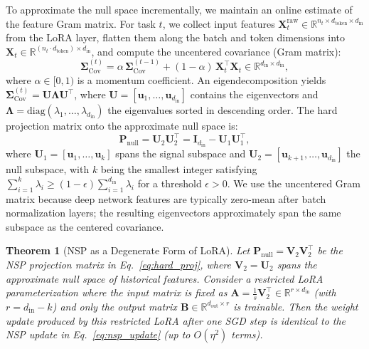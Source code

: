 \documentclass{article}
\newtheorem{theorem}{Theorem}[section]
\begin{document}
To approximate the null space incrementally, we maintain an online estimate of the feature Gram matrix. For task $t$, we collect input features $\mathbf{X}_t^{\text{raw}} \in \mathbb{R}^{n_t \times d_{\text{token}} \times d_{\text{in}}}$ from the LoRA layer, flatten them along the batch and token dimensions into $\mathbf{X}_t \in \mathbb{R}^{(n_t \cdot d_{\text{token}}) \times d_{\text{in}}}$, and compute the uncentered covariance (Gram matrix):
\begin{equation}
    \mathbf{\Sigma}_{\text{Cov}}^{(t)} = \alpha \, \mathbf{\Sigma}_{\text{Cov}}^{(t-1)} + (1-\alpha) \, \mathbf{X}_t^\top \mathbf{X}_t \in \mathbb{R}^{d_{\text{in}} \times d_{\text{in}}},
    \label{eq:cov_ema}
\end{equation}
where $\alpha \in [0,1)$ is a momentum coefficient. An eigendecomposition yields $\mathbf{\Sigma}_{\text{Cov}}^{(t)} = \mathbf{U}\mathbf{\Lambda} \mathbf{U}^\top$, where $\mathbf{U} = [\mathbf{u}_1, \ldots, \mathbf{u}_{d_{\text{in}}}]$ contains the eigenvectors and $\mathbf{\Lambda} = \mathrm{diag}(\lambda_1, \ldots, \lambda_{d_{\text{in}}})$ the eigenvalues sorted in descending order. The hard projection matrix onto the approximate null space is:
\begin{equation}
    \mathbf{P}_{\text{null}} = \mathbf{U}_2\mathbf{U}_2^\top = \mathbf{I}_{d_{\text{in}}} - \mathbf{U}_1\mathbf{U}_1^\top,
    \label{eq:hard_proj}
\end{equation}
where $\mathbf{U}_1 = [\mathbf{u}_1, \ldots, \mathbf{u}_k]$ spans the signal subspace and $\mathbf{U}_2 = [\mathbf{u}_{k+1}, \ldots, \mathbf{u}_{d_{\text{in}}}]$ the null subspace, with $k$ being the smallest integer satisfying $\sum_{i=1}^k \lambda_i \geq (1-\epsilon)\sum_{i=1}^{d_{\text{in}}} \lambda_i$ for a threshold $\epsilon > 0$. We use the uncentered Gram matrix because deep network features are typically zero-mean after batch normalization layers; the resulting eigenvectors approximately span the same subspace as the centered covariance.

\begin{theorem}[NSP as a Degenerate Form of LoRA]
\label{thm:nsp_lora}
Let $\mathbf{P}_{\text{null}} = \mathbf{V}_2\mathbf{V}_2^\top$ be the NSP projection matrix in Eq.~\eqref{eq:hard_proj}, where $\mathbf{V}_2 = \mathbf{U}_2$ spans the approximate null space of historical features. Consider a restricted LoRA parameterization where the input matrix is fixed as $\mathbf{A} = \frac{1}{s}\mathbf{V}_2^\top \in \mathbb{R}^{r \times d_{\text{in}}}$ (with $r = d_{\text{in}} - k$) and only the output matrix $\mathbf{B} \in \mathbb{R}^{d_{\text{out}} \times r}$ is trainable. Then the weight update produced by this restricted LoRA after one SGD step is identical to the NSP update in Eq.~\eqref{eq:nsp_update} (up to $O(\eta^2)$ terms).
\end{theorem}
\end{document}
